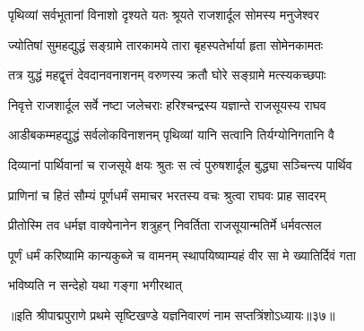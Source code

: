 \twolineshloka
{पृथिव्यां सर्वभूतानां विनाशो दृश्यते यतः}
{श्रूयते राजशार्दूल सोमस्य मनुजेश्वर}%

\twolineshloka
{ज्योतिषां सुमहद्युद्धं सङ्ग्रामे तारकामये}
{तारा बृहस्पतेर्भार्या हृता सोमेनकामतः}%

\twolineshloka
{तत्र युद्धं महद्वृत्तं देवदानवनाशनम्}
{वरुणस्य क्रतौ घोरे सङ्ग्रामे मत्स्यकच्छपाः}%

\twolineshloka
{निवृत्ते राजशार्दूल सर्वे नष्टा जलेचराः}
{हरिश्चन्द्रस्य यज्ञान्ते राजसूयस्य राघव}%

\twolineshloka
{आडीबकम्महद्युद्धं सर्वलोकविनाशनम्}
{पृथिव्यां यानि सत्वानि तिर्यग्योनिगतानि वै}%

\twolineshloka
{दिव्यानां पार्थिवानां च राजसूये क्षयः श्रुतः}
{स त्वं पुरुषशार्दूल बुद्ध्या सञ्चिन्त्य पार्थिव}%

\twolineshloka
{प्राणिनां च हितं सौम्यं पूर्णधर्मं समाचर}
{भरतस्य वचः श्रुत्वा राघवः प्राह सादरम्}%

\twolineshloka
{प्रीतोस्मि तव धर्मज्ञ वाक्येनानेन शत्रुहन्}
{निवर्तिता राजसूयान्मतिर्मे धर्मवत्सल}%

\twolineshloka
{पूर्णं धर्मं करिष्यामि कान्यकुब्जे च वामनम्}
{स्थापयिष्याम्यहं वीर सा मे ख्यातिर्दिवं गता}%

\onelineshloka
{भविष्यति न सन्देहो यथा गङ्गा भगीरथात्}%

{॥इति श्रीपाद्मपुराणे प्रथमे सृष्टिखण्डे यज्ञनिवारणं नाम सप्तत्रिंशोऽध्यायः॥३७॥}

